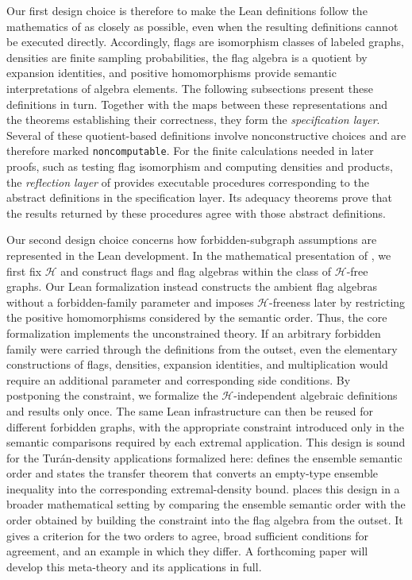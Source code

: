 \documentclass{article}
\newcommand{\lean}[1]{\texttt{#1}}
\begin{document}
Our first design choice is therefore to make the Lean definitions follow the
mathematics of  as closely as possible, even when the
resulting definitions cannot be executed directly.  Accordingly, flags are
isomorphism classes of labeled graphs, densities are finite sampling
probabilities, the flag algebra is a quotient by expansion identities, and
positive homomorphisms provide semantic interpretations of algebra elements.
The following subsections present these definitions in turn.  Together with
the maps between these representations and the theorems establishing their
correctness, they form the \emph{specification layer}.  Several of these
quotient-based definitions involve nonconstructive choices and are therefore
marked \lean{noncomputable}.  For the finite calculations needed in later
proofs, such as testing flag isomorphism and computing densities and products,
the \emph{reflection layer} of  provides executable
procedures corresponding to the abstract definitions in the specification
layer.  Its adequacy theorems prove that the results returned by these
procedures agree with those abstract definitions.

Our second design choice concerns how forbidden-subgraph assumptions are
represented in the Lean development.  In the mathematical presentation of
, we first fix \(\mathcal{H}\) and construct flags and
flag algebras within the class of \(\mathcal{H}\)-free graphs.  Our Lean
formalization instead constructs the ambient flag algebras without a
forbidden-family parameter and imposes \(\mathcal{H}\)-freeness later by
restricting the positive homomorphisms considered by the semantic order.  Thus,
the core formalization implements the unconstrained theory.  If an arbitrary
forbidden family were carried through the definitions from the outset, even
the elementary constructions of flags, densities, expansion identities, and
multiplication would require an additional parameter and corresponding side
conditions.  By postponing the constraint, we formalize the
\(\mathcal{H}\)-independent algebraic definitions and results only once.  The
same Lean infrastructure can then be reused for different forbidden graphs,
with the appropriate constraint introduced only in the semantic comparisons
required by each extremal application.  This design is sound for the
Tur\'an-density applications formalized here:  defines the
ensemble semantic order and states the transfer theorem that converts an
empty-type ensemble inequality into the corresponding extremal-density bound.
 places this design in a broader mathematical setting by
comparing the ensemble semantic order with the order obtained by building the
constraint into the flag algebra from the outset.  It gives a criterion for
the two orders to agree, broad sufficient conditions for agreement, and an
example in which they differ.  A forthcoming paper will develop this
meta-theory and its applications in full.
\end{document}
